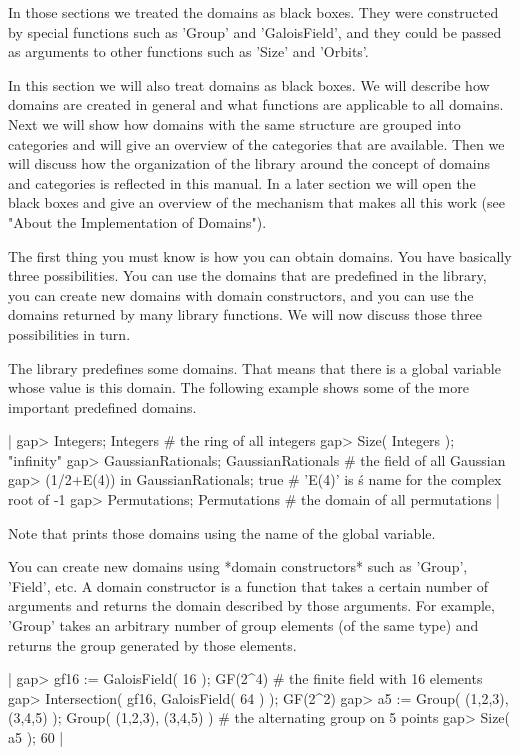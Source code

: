 In those sections we  treated the domains   as  black boxes.    They were
constructed by  special functions such as 'Group'  and 'GaloisField', and
they could be passed as arguments to  other functions such  as 'Size' and
'Orbits'.

In this section we  will also treat  domains  as  black  boxes.   We will
describe  how  domains are  created  in general and  what  functions  are
applicable to all domains.  Next we will  show how  domains with the same
structure are grouped into categories  and will give an  overview of  the
categories that are available.  Then we will discuss how the organization
of the {\GAP}  library around the concept  of  domains and  categories is
reflected in  this manual.  In a  later section  we will open  the  black
boxes and give an overview of the mechanism that makes all this work (see
"About the Implementation of Domains").

The  first thing you must know  is how you can  obtain domains.  You have
basically  three  possibilities.   You  can use    the domains   that are
predefined in  the  library,  you can create   new  domains  with  domain
constructors,  and  you can  use  the  domains  returned by  many library
functions.  We will now discuss those three possibilities in turn.

The {\GAP} library predefines some  domains.  That means that there  is a
global variable whose value is  this domain.  The following example shows
some of the more important predefined domains.

|    gap> Integers;
    Integers    # the ring of all integers
    gap> Size( Integers );
    "infinity"
    gap> GaussianRationals;
    GaussianRationals    # the field of all Gaussian
    gap> (1/2+E(4)) in GaussianRationals;
    true    # 'E(4)' is {\GAP}\'s name for the complex root of -1
    gap> Permutations;
    Permutations    # the domain of all permutations |

Note that  {\GAP}  prints  those domains   using the  name  of the global
variable.

You can create  new domains  using *domain constructors* such as 'Group',
'Field', etc.   A domain constructor is a  function that  takes a certain
number of arguments and returns the domain described by  those arguments.
For example, 'Group' takes an arbitrary number of  group elements (of the
same type) and returns the group generated by those elements.

|    gap> gf16 := GaloisField( 16 );
    GF(2^4)    # the finite field with 16 elements
    gap> Intersection( gf16, GaloisField( 64 ) );
    GF(2^2)
    gap> a5 := Group( (1,2,3), (3,4,5) );
    Group( (1,2,3), (3,4,5) )    # the alternating group on 5 points
    gap> Size( a5 );
    60 |

